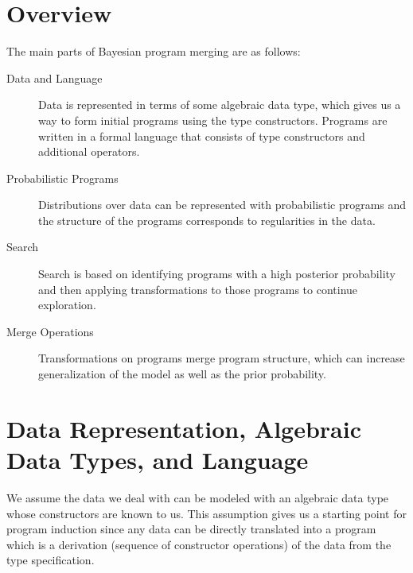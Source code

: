 \documentclass[a4paper,10pt]{article}
\begin{document}
\section{Overview}
The main parts of Bayesian program merging are as follows:
\begin{description}
\item[Data and Language] Data is represented in terms of some algebraic data type, which gives us a way to form initial programs using the type constructors.  Programs are written in a formal language that consists of type constructors and additional operators.
\item[Probabilistic Programs]  Distributions over data can be represented with probabilistic programs and the structure of the programs corresponds to regularities in the data.
\item[Search] Search is based on identifying programs with a high posterior probability and then applying transformations to those programs to continue exploration.
\item[Merge Operations] Transformations on programs merge program structure, which can increase generalization of the model as well as the prior probability.
\end{description}
\section{Data Representation, Algebraic Data Types, and Language}
We assume the data we deal with can be modeled with an algebraic data type whose constructors are known to us.  This assumption gives us a starting point for program induction since any data can be directly translated into a program which is a derivation (sequence of constructor operations) of the data from the type specification. 
\end{document}
